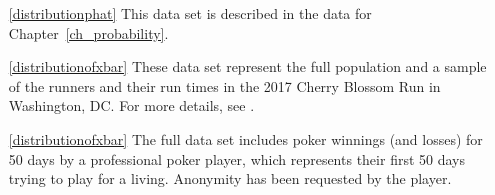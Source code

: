 \D{\newpage}


\begin{itemize}

\item[\ref{distributionphat}]
    This data set is described in
    the data for Chapter~\ref{ch_probability}.

\item[\ref{distributionofxbar}]
    These data set represent the full population and a sample
    of the runners and their run times in the 2017 Cherry Blossom Run
    in Washington, DC. For more details, see
    .

\item[\ref{distributionofxbar}]
    The full data set includes poker winnings (and losses)
    for 50 days by a professional
    poker player, which represents their first 50 days trying
    to play for a living.
    Anonymity has been requested by the player.

\end{itemize}





